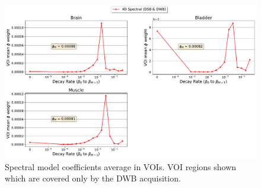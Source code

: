 \begin{figure} [ht!]
\centering
\includegraphics[scale=0.48,angle=0]{3_Results/3_3_DWB_Reconstruction/figures/3_3_IsotoPK_CTRL_DWB_SpectralParams_peripheral_.pdf}
\caption{Spectral model coefficients average in VOIs. VOI regions shown which are covered only by the DWB acquisition.}
\label{fig_3_3:IsotoPK_CTRL_DSB_Spectrals}
\end{figure} 

\clearpage
